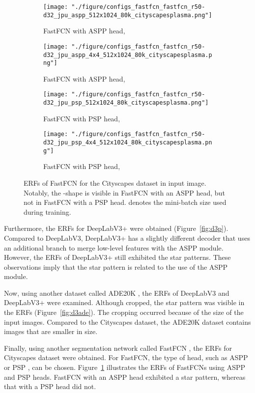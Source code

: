 \documentclass{article}
\def\figref#1{Figure~\ref{#1}}
\begin{document}
\begin{figure}[t!]
	\centering
	\begin{subfigure}[b]{0.241\linewidth}
		\centering
		\texttt{[image: "./figure/configs\_fastfcn\_fastfcn\_r50-d32\_jpu\_aspp\_512x1024\_80k\_cityscapesplasma.png"]}
		\caption{FastFCN with ASPP head, }
	\end{subfigure}
	\hfill
	\begin{subfigure}[b]{0.241\linewidth}
		\centering
		\texttt{[image: "./figure/configs\_fastfcn\_fastfcn\_r50-d32\_jpu\_aspp\_4x4\_512x1024\_80k\_cityscapesplasma.png"]}
		\caption{FastFCN with ASPP head, }
	\end{subfigure}
	\hfill
	\begin{subfigure}[b]{0.241\linewidth}
		\centering
		\texttt{[image: "./figure/configs\_fastfcn\_fastfcn\_r50-d32\_jpu\_psp\_512x1024\_80k\_cityscapesplasma.png"]}
		\caption{FastFCN with PSP head, }
	\end{subfigure}
	\hfill
	\begin{subfigure}[b]{0.241\linewidth}
		\centering
		\texttt{[image: "./figure/configs\_fastfcn\_fastfcn\_r50-d32\_jpu\_psp\_4x4\_512x1024\_80k\_cityscapesplasma.png"]}
		\caption{FastFCN with PSP head, }
	\end{subfigure}
	\caption{ERFs of FastFCN for the Cityscapes dataset in  input image. Notably, the \EightStarTaper-shape is visible in FastFCN with an ASPP head, but not in FastFCN with a PSP head.  denotes the mini-batch size used during training.}
	\label{fig:fastfcn}
\end{figure}


Furthermore, the ERFs for DeepLabV3+ were obtained (\figref{fig:d3p}). Compared to DeepLabV3, DeepLabV3+ has a slightly different decoder that uses an additional branch to merge low-level features with the ASPP module. However, the ERFs of DeepLabV3+ still exhibited the star patterns. These observations imply that the star pattern is related to the use of the ASPP module.

Now, using another dataset called ADE20K \citep{DBLP:journals/ijcv/ZhouZPXFBT19}, the ERFs of DeepLabV3 and DeepLabV3+ were examined. Although cropped, the star pattern was visible in the ERFs (\figref{fig:d3ade}). The cropping occurred because of the  size of the input images. Compared to the Cityscapes dataset, the ADE20K dataset contains images that are smaller in size.

Finally, using another segmentation network called FastFCN \citep{DBLP:journals/corr/abs-1903-11816}, the ERFs for Cityscapes dataset were obtained. For FastFCN, the type of head, such as ASPP or PSP \citep{DBLP:conf/cvpr/ZhaoSQWJ17}, can be chosen. \figref{fig:fastfcn} illustrates the ERFs of FastFCNs using ASPP and PSP heads. FastFCN with an ASPP head exhibited a star pattern, whereas that with a PSP head did not.
\end{document}
